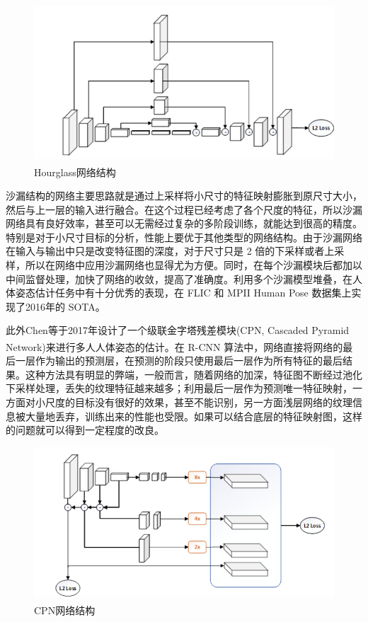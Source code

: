 \begin{figure}[h]
	\centering
	\includegraphics[scale=0.8]{figures/16.png}
	\caption{Hourglass网络结构\textsuperscript{\cite{p23}}}
	\label{fig:f16}
\end{figure}

沙漏结构的网络主要思路就是通过上采样将小尺寸的特征映射膨胀到原尺寸大小，然后与上一层的输入进行融合。在这个过程已经考虑了各个尺度的特征，所以沙漏网络具有良好效率，甚至可以无需经过复杂的多阶段训练，就能达到很高的精度。特别是对于小尺寸目标的分析，性能上要优于其他类型的网络结构。由于沙漏网络在输入与输出中只是改变特征图的深度，对于尺寸只是 2 倍的下采样或者上采样，所以在网络中应用沙漏网络也显得尤为方便。同时，在每个沙漏模块后都加以中间监督处理，加快了网络的收敛，提高了准确度。利用多个沙漏模型堆叠，在人体姿态估计任务中有十分优秀的表现，在 FLIC 和 MPII Human Pose 数据集上实现了2016年的 SOTA。

此外Chen等于2017年设计了一个级联金字塔残差模块(CPN, Cascaded  Pyramid Network)\textsuperscript{\cite{p24}}来进行多人人体姿态的估计。在 R-CNN 算法中，网络直接将网络的最后一层作为输出的预测层，在预测的阶段只使用最后一层作为所有特征的最后结果。这种方法具有明显的弊端，一般而言，随着网络的加深，特征图不断经过池化下采样处理，丢失的纹理特征越来越多；利用最后一层作为预测唯一特征映射，一方面对小尺度的目标没有很好的效果，甚至不能识别，另一方面浅层网络的纹理信息被大量地丢弃，训练出来的性能也受限。如果可以结合底层的特征映射图，这样的问题就可以得到一定程度的改良。

\begin{figure}[h]
	\centering
	\includegraphics[scale=0.8]{figures/17.png}
	\caption{CPN网络结构\textsuperscript{\cite{p24}}}
	\label{fig:f17}
\end{figure}

